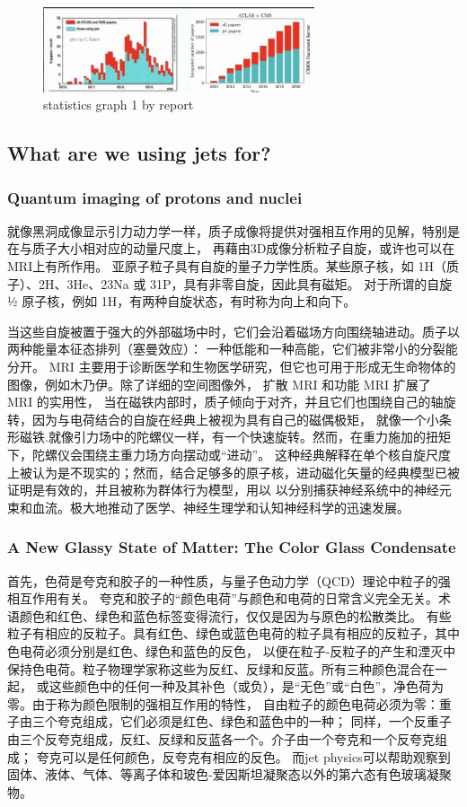 \documentclass[12pt, a4paper, oneside]{ctexart}
\begin{document}
\begin{spacing}{2.0}
\begin{figure}[htbp]
	\centering
	\includegraphics[width=8cm]{sigma.jpg}
	\caption{statistics graph 1 by report}
\end{figure}
\subsection{What are we using jets for?}
\subsubsection{Quantum imaging of protons and nuclei}
就像黑洞成像显示引力动力学一样，质子成像将提供对强相互作用的见解，特别是在与质子大小相对应的动量尺度上，
再藉由3D成像分析粒子自旋，或许也可以在MRI上有所作用。
亚原子粒子具有自旋的量子力学性质。某些原子核，如 1H（质子）、2H、3He、23Na 或 31P，具有非零自旋，因此具有磁矩。
对于所谓的自旋 1⁄2 原子核，例如 1H，有两种自旋状态，有时称为向上和向下。

当这些自旋被置于强大的外部磁场中时，它们会沿着磁场方向围绕轴进动。质子以两种能量本征态排列（塞曼效应）：
一种低能和一种高能，它们被非常小的分裂能分开。
MRI 主要用于诊断医学和生物医学研究，但它也可用于形成无生命物体的图像，例如木乃伊。除了详细的空间图像外，
扩散 MRI 和功能 MRI 扩展了 MRI 的实用性，
当在磁铁内部时，质子倾向于对齐，并且它们也围绕自己的轴旋转，因为与电荷结合的自旋在经典上被视为具有自己的磁偶极矩，
就像一个小条形磁铁.就像引力场中的陀螺仪一样，有一个快速旋转。然而，在重力施加的扭矩下，陀螺仪会围绕主重力场方向摆动或“进动”。
这种经典解释在单个核自旋尺度上被认为是不现实的；然而，结合足够多的原子核，进动磁化矢量的经典模型已被证明是有效的，并且被称为群体行为模型，用以
以分别捕获神经系统中的神经元束和血流。极大地推动了医学、神经生理学和认知神经科学的迅速发展。
\subsubsection{A New Glassy State of Matter: The Color Glass Condensate}
首先，色荷是夸克和胶子的一种性质，与量子色动力学（QCD）理论中粒子的强相互作用有关。
夸克和胶子的“颜色电荷”与颜色和电荷的日常含义完全无关。术语颜色和红色、绿色和蓝色标签变得流行，仅仅是因为与原色的松散类比。
有些粒子有相应的反粒子。具有红色、绿色或蓝色电荷的粒子具有相应的反粒子，其中色电荷必须分别是红色、绿色和蓝色的反色，
以便在粒子-反粒子的产生和湮灭中保持色电荷。粒子物理学家称这些为反红、反绿和反蓝。所有三种颜色混合在一起，
或这些颜色中的任何一种及其补色（或负），是“无色”或“白色”，净色荷为零。由于称为颜色限制的强相互作用的特性，
自由粒子的颜色电荷必须为零：重子由三个夸克组成，它们必须是红色、绿色和蓝色中的一种；
同样，一个反重子由三个反夸克组成，反红、反绿和反蓝各一个。介子由一个夸克和一个反夸克组成；
夸克可以是任何颜色，反夸克有相应的反色。
而jet physics可以帮助观察到固体、液体、气体、等离子体和玻色-爱因斯坦凝聚态以外的第六态有色玻璃凝聚物。 \cite{https://doi.org/10.1111/ijag.12013}

\end{spacing}
\end{document}

